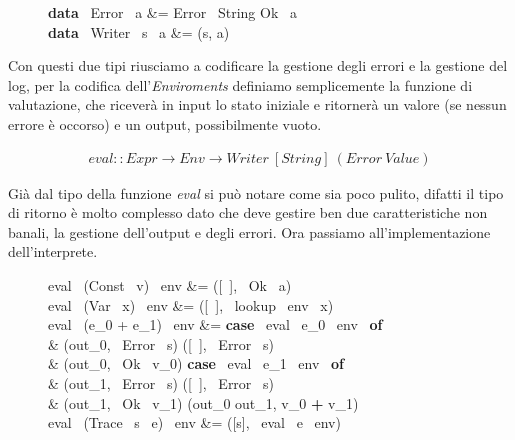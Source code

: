 \begin{figure}[h]
  \centering
  \footnotesize %
  \begin{haskellsyntax}
  \textbf{data} \ Error \ a &= Error \ String \sor Ok \ a
  \\
  \textbf{data} \ Writer \ s \ a &= (s, a)

  \end{haskellsyntax}%

\end{figure}

Con questi due tipi riusciamo a codificare la gestione degli errori e la
gestione del log, per la codifica dell'\textit{Enviroments} definiamo
semplicemente la funzione di valutazione, che riceverà in input lo stato
iniziale e ritornerà un valore (se nessun errore è occorso) e un output,
possibilmente vuoto.

\begin{align*}
  eval :: Expr \to Env \to Writer \ [String] \ (Error \ Value)
\end{align*}

Già dal tipo della funzione \textit{eval} si può notare come sia poco pulito,
difatti il tipo di ritorno è molto complesso dato che deve gestire ben due
caratteristiche non banali, la gestione dell'output e degli errori.
Ora passiamo all'implementazione dell'interprete.

\begin{figure}[H]
  \centering
  \footnotesize %
  \begin{haskellsyntax}
  eval \ (Const \ v) \ env &= ([\ ], \ Ok \ a)\\
  eval \ (Var \ x) \ env   &= ([\ ], \ lookup \ env \ x)\\
  eval \ (e_0 + e_1) \ env  &= \textbf{case} \ eval \ e_0 \ env \ \textbf{of}\\
                            {}& \qquad (out_0, \ Error \ s) \to ([\ ], \ Error \ s)\\
                            {}& \qquad (out_0, \ Ok \ v_0) \quad \to \textbf{case} \ eval \ e_1 \ env \ \textbf{of}\\
                            {}& \qquad \qquad (out_1, \ Error \ s) \to ([\ ], \ Error \ s)\\
                            {}& \qquad \qquad (out_1, \ Ok \ v_1) \quad \to (out_0 \doubleplus out_1, v_0 \textbf{+} v_1)\\
  eval \ (Trace \ s \ e) \ env  &= ([s], \ eval \ e \ env)
  \end{haskellsyntax}%
\end{figure}

